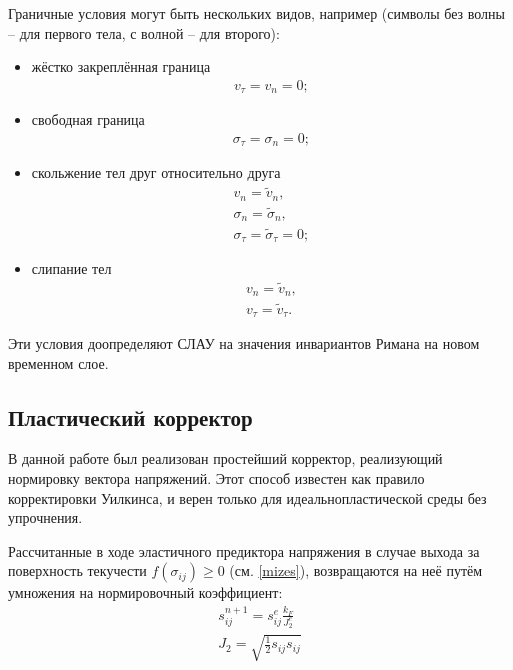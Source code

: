 Граничные условия могут быть нескольких видов, например (символы без волны -- для первого тела, с волной -- для второго):
\begin{itemize}
\item{жёстко закреплённая граница
\begin{eqnarray}
v_\tau=v_n=0; \nonumber
\end{eqnarray}}
\item{свободная граница
\begin{eqnarray}
\sigma_\tau=\sigma_n=0; \nonumber
\end{eqnarray}}
\item{скольжение тел друг относительно друга 
\begin{eqnarray}
v_n=\tilde{v}_n,\nonumber\\
\sigma_n=\tilde{\sigma}_n,\nonumber\\
\sigma_\tau=\tilde{\sigma}_\tau=0; \nonumber
\end{eqnarray}}
\item{слипание тел
\begin{eqnarray}
v_n=\tilde{v}_n,\nonumber\\
v_\tau=\tilde{v}_\tau.
\end{eqnarray}}
\end{itemize}
Эти условия доопределяют СЛАУ на значения инвариантов Римана на новом временном слое.

\subsection{Пластический корректор}
В данной работе был реализован простейший корректор, реализующий нормировку вектора напряжений. Этот способ известен как правило корректировки Уилкинса, и верен только для идеальнопластической среды без упрочнения.

Рассчитанные в ходе эластичного предиктора напряжения в случае выхода за поверхность текучести  $f(\sigma_{ij}) \geq 0$ (см. \ref{mizes}), возвращаются на неё путём умножения на нормировочный коэффициент:
\begin{eqnarray}
s_{ij}^{n+1} = s_{ij}^e\frac{k_F}{J_2^e}	\\
J_2 = \sqrt{\frac{1}{2}s_{ij}s_{ij}}
\end{eqnarray} 
